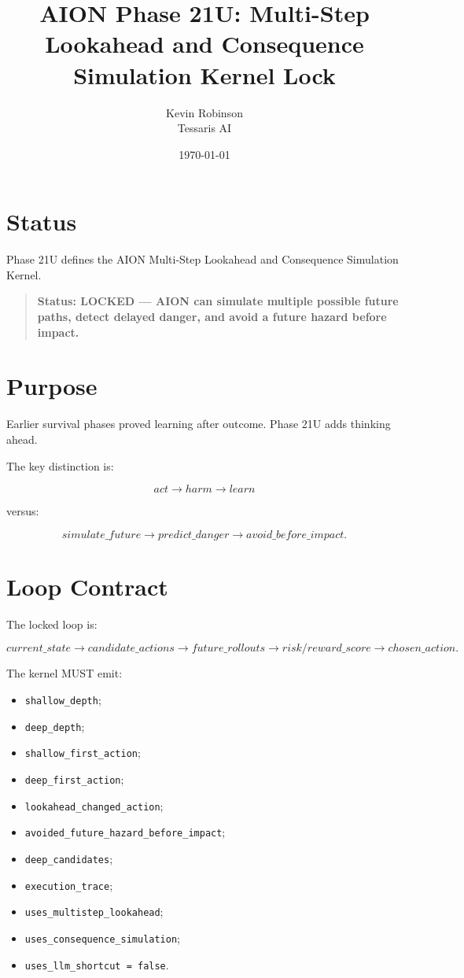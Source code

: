 \documentclass[11pt,a4paper]{article}
\title{\textbf{AION Phase 21U: Multi-Step Lookahead and Consequence Simulation Kernel Lock}}
\author{Kevin Robinson\\Tessaris AI}
\date{\today}
\begin{document}
\maketitle

\section{Status}

Phase 21U defines the AION Multi-Step Lookahead and Consequence Simulation Kernel.

\begin{quote}
\textbf{Status: LOCKED --- AION can simulate multiple possible future paths, detect delayed danger, and avoid a future hazard before impact.}
\end{quote}

\section{Purpose}

Earlier survival phases proved learning after outcome. Phase 21U adds thinking ahead.

The key distinction is:

\[
act \rightarrow harm \rightarrow learn
\]

versus:

\[
simulate\_future \rightarrow predict\_danger \rightarrow avoid\_before\_impact.
\]

\section{Loop Contract}

The locked loop is:

\[
current\_state \rightarrow candidate\_actions
\rightarrow future\_rollouts \rightarrow risk/reward\_score
\rightarrow chosen\_action.
\]

The kernel MUST emit:

\begin{itemize}
  \item \texttt{shallow\_depth};
  \item \texttt{deep\_depth};
  \item \texttt{shallow\_first\_action};
  \item \texttt{deep\_first\_action};
  \item \texttt{lookahead\_changed\_action};
  \item \texttt{avoided\_future\_hazard\_before\_impact};
  \item \texttt{deep\_candidates};
  \item \texttt{execution\_trace};
  \item \texttt{uses\_multistep\_lookahead};
  \item \texttt{uses\_consequence\_simulation};
  \item \texttt{uses\_llm\_shortcut = false}.
\end{itemize}
\end{document}
